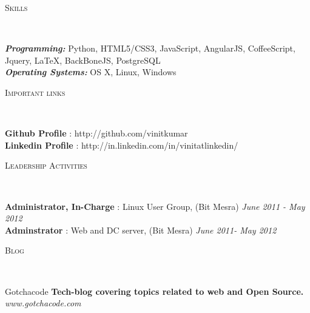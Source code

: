 \documentclass[9pt]{article}
\newenvironment{changemargin}[2]{%
  \begin{list}{}{%
    \setlength{\topsep}{0pt}%
    \setlength{\leftmargin}{#1}%
    \setlength{\rightmargin}{#2}%
    \setlength{\listparindent}{\parindent}%
    \setlength{\itemindent}{\parindent}%
    \setlength{\parsep}{\parskip}%
  }%
  \item[]}{\end{list}
}
\newcommand{\lineover}{
	\begin{changemargin}{-0.05in}{-0.05in}
		\vspace*{-8pt}
		\hrulefill \\
		\vspace*{-2pt}
	\end{changemargin}
}
\newcommand{\header}[1]{
	\begin{changemargin}{-0.5in}{-0.5in}
		\scshape{#1}\\
  	\lineover
	\end{changemargin}
}
\newenvironment{body} {
	\vspace*{-16pt}
	\begin{changemargin}{-0.25in}{-0.5in}
  }	
	{\end{changemargin}
}
\begin{document}

\header{Skills}

\begin{body}
	\vspace{14pt}
	\emph{\textbf{Programming:}}{} Python, HTML5/CSS3,  JavaScript, AngularJS, CoffeeScript, Jquery, \LaTeX, BackBoneJS, PostgreSQL\\
	\medskip
	\emph{\textbf{Operating Systems:}}{} OS X, Linux,  Windows\\
\end{body}

\smallskip


\header{Important links}

\begin{body}
	\vspace{14pt}
	\textbf{Github Profile} : http://github.com/vinitkumar \hfill{}\\
	\smallskip
	\textbf{Linkedin Profile} : http://in.linkedin.com/in/vinitatlinkedin/ \hfill{}\\
\end{body}

\smallskip

\header{Leadership Activities}

\begin{body}
	\vspace{14pt}
	\textbf{Administrator, In-Charge} : Linux User Group, (Bit Mesra) \hfill {} \emph{June 2011 - May 2012}\\
	\smallskip
	\textbf{Adminstrator} : Web and DC server, (Bit Mesra) \hfill{} \emph{June 2011- May 2012}\\
\end{body}

\smallskip

\header{Blog}

\begin{body}
	\vspace{14pt}
	Gotchacode \textbf{Tech-blog covering topics related to web and Open Source.} \emph{ www.gotchacode.com}\\
	\smallskip
\end{body}

\smallskip
\end{document}
